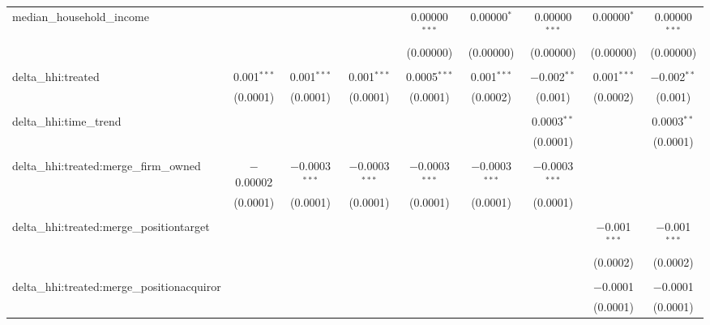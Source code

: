 \begin{table}[H]
{\begin{tabular}{@{\extracolsep{5pt}}lcccccccc}
  median\_household\_income &  &  &  & 0.00000$^{***}$ & 0.00000$^{*}$ & 0.00000$^{***}$ & 0.00000$^{*}$ & 0.00000$^{***}$ \\  

   &  &  &  & (0.00000) & (0.00000) & (0.00000) & (0.00000) & (0.00000) \\  

   & & & & & & & & \\  

  delta\_hhi:treated & 0.001$^{***}$ & 0.001$^{***}$ & 0.001$^{***}$ & 0.0005$^{***}$ & 0.001$^{***}$ & $-$0.002$^{**}$ & 0.001$^{***}$ & $-$0.002$^{**}$ \\  

   & (0.0001) & (0.0001) & (0.0001) & (0.0001) & (0.0002) & (0.001) & (0.0002) & (0.001) \\  

   & & & & & & & & \\  

  delta\_hhi:time\_trend &  &  &  &  &  & 0.0003$^{**}$ &  & 0.0003$^{**}$ \\  

   &  &  &  &  &  & (0.0001) &  & (0.0001) \\  

   & & & & & & & & \\  

  delta\_hhi:treated:merge\_firm\_owned & $-$0.00002 & $-$0.0003$^{***}$ & $-$0.0003$^{***}$ & $-$0.0003$^{***}$ & $-$0.0003$^{***}$ & $-$0.0003$^{***}$ &  &  \\  

   & (0.0001) & (0.0001) & (0.0001) & (0.0001) & (0.0001) & (0.0001) &  &  \\  

   & & & & & & & & \\  

  delta\_hhi:treated:merge\_positiontarget &  &  &  &  &  &  & $-$0.001$^{***}$ & $-$0.001$^{***}$ \\  

   &  &  &  &  &  &  & (0.0002) & (0.0002) \\  

   & & & & & & & & \\  

  delta\_hhi:treated:merge\_positionacquiror &  &  &  &  &  &  & $-$0.0001 & $-$0.0001 \\  

   &  &  &  &  &  &  & (0.0001) & (0.0001) \\  


\end{tabular}}
\end{table}
